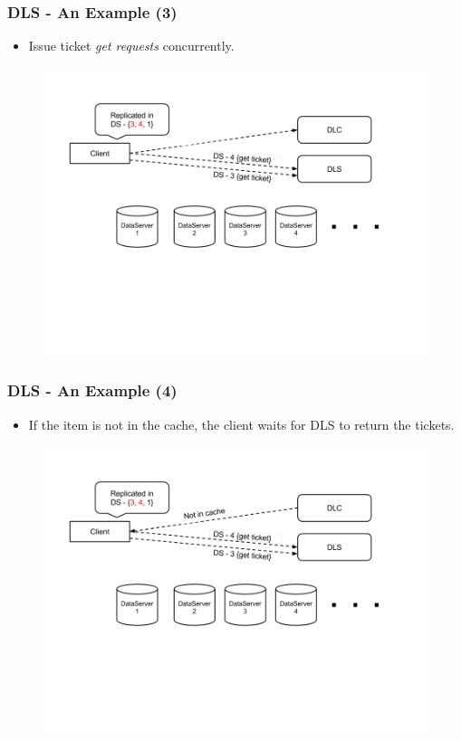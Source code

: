 \documentclass{beamer}
\begin{document}
\begin{frame}
  \frametitle{DLS - An Example (3)}
  \begin{itemize}
  \item Issue ticket \textit{get requests} concurrently.
\newline
  \end{itemize}
  \begin{figure}
    \begin{center}
      \centerline{\includegraphics[scale=0.40]{img/DLS_Example4.png}}
    \end{center}
  \end{figure}

\end{frame}

\begin{frame}
  \frametitle{DLS - An Example (4)}
  \begin{itemize}
  \item If the item is not in the cache, the client waits for DLS to
    return the tickets.
  \end{itemize}
  \begin{figure}
    \begin{center}
      \centerline{\includegraphics[scale=0.40]{img/DLS_Example5.png}}
    \end{center}
  \end{figure}
\end{frame}
\end{document}
